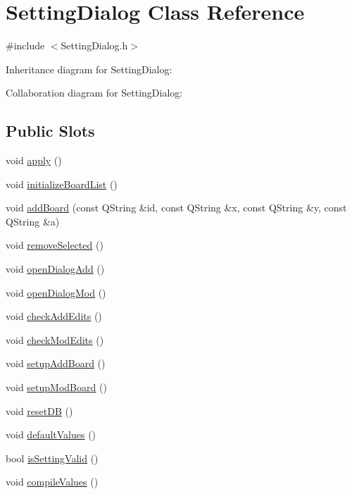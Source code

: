\hypertarget{class_setting_dialog}{}\section{Setting\+Dialog Class Reference}
\label{class_setting_dialog}


{\ttfamily \#include $<$Setting\+Dialog.\+h$>$}



Inheritance diagram for Setting\+Dialog\+:


Collaboration diagram for Setting\+Dialog\+:
\subsection*{Public Slots}
\begin{DoxyCompactItemize}
\item 
void \hyperlink{class_setting_dialog_a57d2bfa1e43decae6ad91c00ee91363c}{apply} ()
\item 
void \hyperlink{class_setting_dialog_a6fe937ee3aa7b80823783c1842b883fd}{initialize\+Board\+List} ()
\item 
void \hyperlink{class_setting_dialog_ac7847fe2e100c72c58f5c644db22961e}{add\+Board} (const Q\+String \&id, const Q\+String \&x, const Q\+String \&y, const Q\+String \&a)
\item 
void \hyperlink{class_setting_dialog_a9d5263cf6d408810b96a08774c68b91e}{remove\+Selected} ()
\item 
void \hyperlink{class_setting_dialog_a0036c00515df69b40ae9427b943d09ce}{open\+Dialog\+Add} ()
\item 
void \hyperlink{class_setting_dialog_a88c1e32d44b349f50792097f74a58364}{open\+Dialog\+Mod} ()
\item 
void \hyperlink{class_setting_dialog_aab115d0e77480b817fdfcd59a9a3652f}{check\+Add\+Edits} ()
\item 
void \hyperlink{class_setting_dialog_aff7ed5a09e49070b13028568b8dd2d0a}{check\+Mod\+Edits} ()
\item 
void \hyperlink{class_setting_dialog_af0469277c1c7cbb9d39f763d4dacb8c6}{setup\+Add\+Board} ()
\item 
void \hyperlink{class_setting_dialog_a9a40a643ecd914be543876fe61c4518a}{setup\+Mod\+Board} ()
\item 
void \hyperlink{class_setting_dialog_a0f0752ea8686805bade1dabe9cbc64b2}{reset\+DB} ()
\item 
void \hyperlink{class_setting_dialog_a6801ca5900f6e9e18e73d7c7ca56031e}{default\+Values} ()
\item 
bool \hyperlink{class_setting_dialog_ac1b49924409e267093cfc6e9507ef676}{is\+Setting\+Valid} ()
\item 
void \hyperlink{class_setting_dialog_a21152ee14a4412e240920da5b633507f}{compile\+Values} ()
\end{DoxyCompactItemize}

